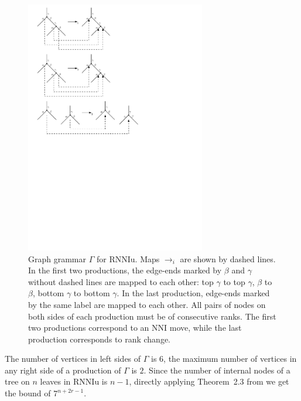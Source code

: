 \documentclass[11pt]{amsart}
\theoremstyle{definition}
\newcommand{\nni}{\mathrm{NNI}}
\newcommand{\rnniu}{\mathrm{RNNIu}}
\begin{document}
\begin{figure}
\centering
\includegraphics[width=0.7\textwidth]{grammar_rNNIu.pdf}
\caption{Graph grammar $\Gamma$ for $\rnniu$.
Maps $\to_i$ are shown by dashed lines.
In the first two productions, the edge-ends marked by $\beta$ and $\gamma$ without dashed lines are mapped to each other: top $\gamma$ to top $\gamma$, $\beta$ to $\beta$, bottom $\gamma$ to bottom $\gamma$.
In the last production, edge-ends marked by the same label are mapped to each other.
All pairs of nodes on both sides of each production must be of consecutive ranks.
The first two productions correspond to an $\nni$ move, while the last production corresponds to rank change.}
\label{grammar_rNNIu.pdf}
\end{figure}

The number of vertices in left sides of $\Gamma$ is $6$, the maximum number of vertices in any right side of a production of $\Gamma$ is $2$.
Since the number of internal nodes of a tree on $n$ leaves in $\rnniu$ is $n-1$, directly applying Theorem~2.3 from \autocite{Sleator1992-bp} we get the bound of $7^{n+2r-1}$.
\end{document}
